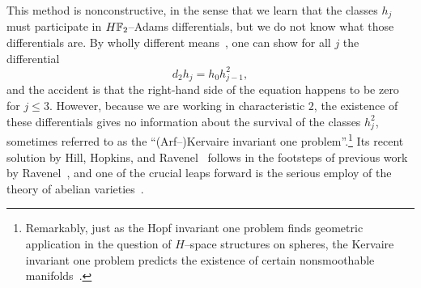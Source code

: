 \begin{remark}
This method is nonconstructive, in the sense that we learn that the classes \(h_j\) must participate in \(\HFtwo\)--Adams differentials, but we do not know what those differentials are.  By wholly different means~\cite[Corollary VI.1.5]{BMMS}, one can show for all \(j\) the differential \[d_2 h_j = h_0 h_{j-1}^2,\] and the accident is that the right-hand side of the equation happens to be zero for \(j \le 3\).  However, because we are working in characteristic \(2\), the existence of these differentials gives no information about the survival of the classes \(h_j^2\), sometimes referred to as the ``(Arf--)Kervaire invariant one problem''.\footnote{Remarkably, just as the Hopf invariant one problem finds geometric application in the question of \(H\)--space structures on spheres, the Kervaire invariant one problem predicts the existence of certain nonsmoothable manifolds~\cite{Browder}.}  Its recent solution by Hill, Hopkins, and Ravenel~\cite{HHR} follows in the footsteps of previous work by Ravenel~\cite{RavenelNonexistenceArfInvariantElts}, and one of the crucial leaps forward is the serious employ of the theory of abelian varieties~\cite{MoravaAbVarsAndKervaire}.
\end{remark}











